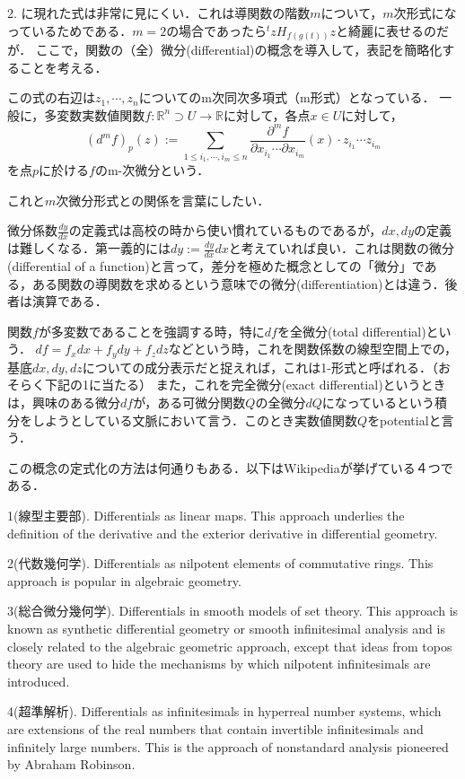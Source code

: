 \documentclass[uplatex, dvipdfmx]{jsreport}
\begin{document}
2. に現れた式は非常に見にくい．これは導関数の階数$m$について，$m$次形式になっているためである．$m=2$の場合であったら${}^tzH_{f(g(t))}z$と綺麗に表せるのだが．
ここで，関数の（全）微分(differential)の概念を導入して，表記を簡略化することを考える．
\begin{definition}
    この式の右辺は$z_1,\cdots,z_n$についてのm次同次多項式（m形式）となっている．
    一般に，多変数実数値関数$f:\mathbb{R}^n\supset U\to\mathbb{R}$に対して，各点$x\in U$に対して，
    \[ (d^mf)_p(z):=\sum_{1\le i_1,\cdots,i_m\le n}\frac{\partial^m f}{\partial x_{i_1}\cdots\partial x_{i_m}}(x)\cdot z_{i_1}\cdots z_{i_m} \]
    を点$p$に於ける$f$のm-次微分という．
\end{definition}
これと$m$次微分形式との関係を言葉にしたい．

\begin{remark}[m次微分という概念の概観]
    微分係数$\frac{dy}{dx}$の定義式は高校の時から使い慣れているものであるが，$dx, dy$の定義は難しくなる．第一義的には$dy:=\frac{dy}{dx}dx$と考えていれば良い．これは関数の微分(differential of a function)と言って，差分を極めた概念としての「微分」である，ある関数の導関数を求めるという意味での微分(differentiation)とは違う．後者は演算である．
    
    関数$f$が多変数であることを強調する時，特に$df$を全微分(total differential)という．
    $df=f_xdx+f_ydy+f_zdz$などという時，これを関数係数の線型空間上での，基底$dx,dy,dz$についての成分表示だと捉えれば，これは1-形式と呼ばれる．（おそらく下記の1に当たる）
    また，これを完全微分(exact differential)というときは，興味のある微分$df$が，ある可微分関数$Q$の全微分$dQ$になっているという積分をしようとしている文脈において言う．このとき実数値関数$Q$をpotentialと言う．

    この概念の定式化の方法は何通りもある．以下はWikipediaが挙げている４つである．

    1(線型主要部). Differentials as linear maps. This approach underlies the definition of the derivative and the exterior derivative in differential geometry.
    
    2(代数幾何学). Differentials as nilpotent elements of commutative rings. This approach is popular in algebraic geometry.

    3(総合微分幾何学). Differentials in smooth models of set theory. This approach is known as synthetic differential geometry or smooth infinitesimal analysis and is closely related to the algebraic geometric approach, except that ideas from topos theory are used to hide the mechanisms by which nilpotent infinitesimals are introduced.

    4(超準解析). Differentials as infinitesimals in hyperreal number systems, which are extensions of the real numbers that contain invertible infinitesimals and infinitely large numbers. This is the approach of nonstandard analysis pioneered by Abraham Robinson.
\end{remark}
\end{document}
